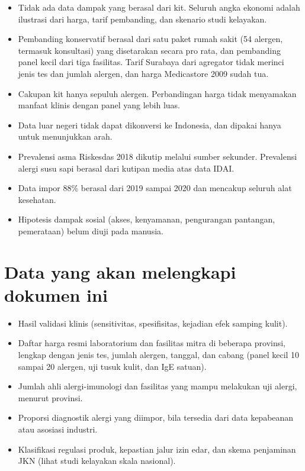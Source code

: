 \documentclass[11pt,a4paper]{article}
\begin{document}
\begin{itemize}
\item Tidak ada data dampak yang berasal dari kit. Seluruh angka ekonomi adalah ilustrasi dari harga, tarif pembanding, dan skenario studi kelayakan.
\item Pembanding konservatif berasal dari satu paket rumah sakit (54 alergen, termasuk konsultasi) yang disetarakan secara pro rata, dan pembanding panel kecil dari tiga fasilitas. Tarif Surabaya dari agregator tidak merinci jenis tes dan jumlah alergen, dan harga Medicastore 2009 sudah tua.
\item Cakupan kit hanya sepuluh alergen. Perbandingan harga tidak menyamakan manfaat klinis dengan panel yang lebih luas.
\item Data luar negeri tidak dapat dikonversi ke Indonesia, dan dipakai hanya untuk menunjukkan arah.
\item Prevalensi asma Riskesdas 2018 dikutip melalui sumber sekunder. Prevalensi alergi susu sapi berasal dari kutipan media atas data IDAI.
\item Data impor 88\% berasal dari 2019 sampai 2020 dan mencakup seluruh alat kesehatan.
\item Hipotesis dampak sosial (akses, kenyamanan, pengurangan pantangan, pemerataan) belum diuji pada manusia.
\end{itemize}

\section{Data yang akan melengkapi dokumen ini}
\label{sec:data}

\begin{itemize}
\item Hasil validasi klinis (sensitivitas, spesifisitas, kejadian efek samping kulit).
\item Daftar harga resmi laboratorium dan fasilitas mitra di beberapa provinsi, lengkap dengan jenis tes, jumlah alergen, tanggal, dan cabang (panel kecil 10 sampai 20 alergen, uji tusuk kulit, dan IgE satuan).
\item Jumlah ahli alergi-imunologi dan fasilitas yang mampu melakukan uji alergi, menurut provinsi.
\item Proporsi diagnostik alergi yang diimpor, bila tersedia dari data kepabeanan atau asosiasi industri.
\item Klasifikasi regulasi produk, kepastian jalur izin edar, dan skema penjaminan JKN (lihat studi kelayakan skala nasional).
\end{itemize}
\end{document}

